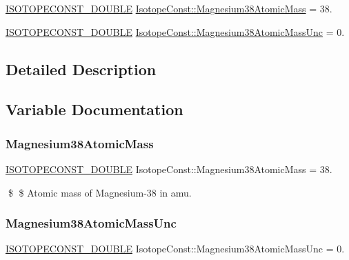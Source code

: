 \begin{DoxyCompactItemize}
\item 
\mbox{\hyperlink{group___isotope_const-_macros_ga8f45a7272ce02c0b4c65c44636ed719a}{I\+S\+O\+T\+O\+P\+E\+C\+O\+N\+S\+T\+\_\+\+D\+O\+U\+B\+LE}} \mbox{\hyperlink{group___isotope_const-_magnesium-_mg38_gac6bbbb9c942c16cf78ff6f12258dc0fa}{Isotope\+Const\+::\+Magnesium38\+Atomic\+Mass}} = 38.
\item 
\mbox{\hyperlink{group___isotope_const-_macros_ga8f45a7272ce02c0b4c65c44636ed719a}{I\+S\+O\+T\+O\+P\+E\+C\+O\+N\+S\+T\+\_\+\+D\+O\+U\+B\+LE}} \mbox{\hyperlink{group___isotope_const-_magnesium-_mg38_gacd7232586cb0de2f02cb45d0dbc68896}{Isotope\+Const\+::\+Magnesium38\+Atomic\+Mass\+Unc}} = 0.
\end{DoxyCompactItemize}


\subsection{Detailed Description}


\subsection{Variable Documentation}
\mbox{\label{group___isotope_const-_magnesium-_mg38_gac6bbbb9c942c16cf78ff6f12258dc0fa}} 
\subsubsection{\texorpdfstring{Magnesium38\+Atomic\+Mass}{Magnesium38AtomicMass}}
{\footnotesize\ttfamily \mbox{\hyperlink{group___isotope_const-_macros_ga8f45a7272ce02c0b4c65c44636ed719a}{I\+S\+O\+T\+O\+P\+E\+C\+O\+N\+S\+T\+\_\+\+D\+O\+U\+B\+LE}} Isotope\+Const\+::\+Magnesium38\+Atomic\+Mass = 38.}

\$ \$ Atomic mass of Magnesium-\/38 in amu. \mbox{\label{group___isotope_const-_magnesium-_mg38_gacd7232586cb0de2f02cb45d0dbc68896}} 
\subsubsection{\texorpdfstring{Magnesium38\+Atomic\+Mass\+Unc}{Magnesium38AtomicMassUnc}}
{\footnotesize\ttfamily \mbox{\hyperlink{group___isotope_const-_macros_ga8f45a7272ce02c0b4c65c44636ed719a}{I\+S\+O\+T\+O\+P\+E\+C\+O\+N\+S\+T\+\_\+\+D\+O\+U\+B\+LE}} Isotope\+Const\+::\+Magnesium38\+Atomic\+Mass\+Unc = 0.}

